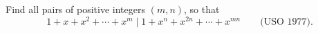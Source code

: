 Find all pairs of positive integers $(m, n)$, so that
\[ 1 + x + x^2 + \cdots + x^m \mid 1 + x^n + x^{2n} + \cdots + x^{mn} \qquad \text{(USO 1977).} \]
